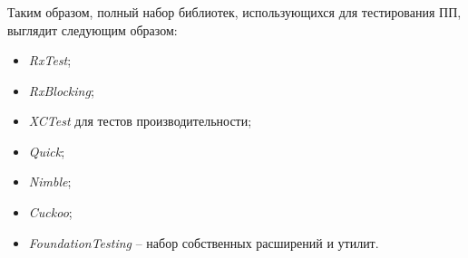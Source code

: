 \subsubsection{}
\label{sec:testing:tech:result}
Таким образом, полный набор библиотек, использующихся для тестирования ПП, выглядит следующим образом:

\begin{itemize}
	\item \textit{RxTest};
	\item \textit{RxBlocking};
	\item \textit{XCTest} для тестов производительности;
	\item \textit{Quick};
	\item \textit{Nimble};
	\item \textit{Cuckoo};
	\item \textit{FoundationTesting} -- набор собственных расширений и утилит.
\end{itemize}